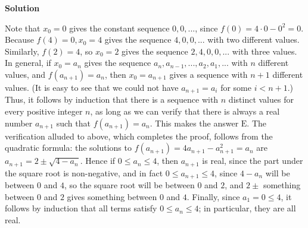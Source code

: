 \begin{enumerate}
\textbf{Solution}

Note that $x_{0} = 0$ gives the constant sequence $0, 0, ...$, since $f(0) = 4 \cdot 0 - 0^2 = 0$. Because $f(4)=0, x_{0} = 4$ gives the sequence $4, 0, 0, ...$ with two different values. Similarly, $f(2) = 4$, so $x_{0} = 2$ gives the sequence $2, 4, 0, 0, ...$ with three values. In general, if $x_{0} = a_{n}$ gives the sequence $a_{n}, a_{n-1}, ... , a_{2}, a_{1}, ...$ with $n$ different values, and $f(a_{n+1}) = a_{n}$, then $x_{0} = a_{n+1}$ gives a sequence with $n+1$ different values. (It is easy to see that we could not have $a_{n+1} = a_{i}$ for some $i < n + 1$.) Thus, it follows by induction that there is a sequence with $n$ distinct values for every positive integer $n$, as long as we can verify that there is always a real number $a_{n+1}$ such that $f(a_{n+1}) = a_{n}$. This makes the answer $\boxed{\text{E}}$. The verification alluded to above, which completes the proof, follows from the quadratic formula: the solutions to $f(a_{n+1}) = 4a_{n+1} - a_{n+1}^{2} = a_{n}$ are $a_{n+1} = 2 \pm \sqrt{4 - a_{n}}$. Hence if $0 \leq a_{n} \leq 4$, then $a_{n+1}$ is real, since the part under the square root is non-negative, and in fact $0 \leq a_{n+1} \leq 4$, since $4-a_{n}$ will be between $0$ and $4$, so the square root will be between $0$ and $2$, and $2 \pm$ something between $0$ and $2$ gives something between $0$ and $4$. Finally, since $a_{1} = 0 \leq 4$, it follows by induction that all terms satisfy $0 \leq a_{n} \leq 4$; in particular, they are all real.

 


\end{enumerate}
